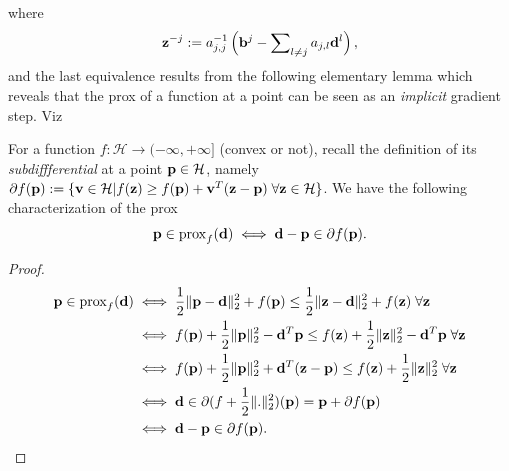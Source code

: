 where
\[
  \mathbf{z}^{-j} := a_{j,j}^{-1}\left(\mathbf{b}^j-\sum\nolimits_{l \ne j}a_{j,l}\mathbf{d}^l\right),
\]
and the last equivalence results from the following elementary lemma which reveals that the prox of a function at a point can be seen as an \textit{implicit} gradient step. Viz
\begin{lemma}
  For a function $f: \mathcal H \rightarrow (-\infty,+\infty]$ (convex or not), recall the definition of its \textit{subdiffferential} at a point $\mathbf{p} \in \mathcal H$, namely  $\partial f(\mathbf{p}) := \{\mathbf{v} \in \mathcal H | f(\mathbf{z}) \ge f(\mathbf{p}) + \mathbf{v}^T(\mathbf{z} - \mathbf{p})\; \forall \mathbf{z} \in \mathcal H\}$. We have the following characterization of the prox
  \begin{equation}
    \mathbf{p} \in \operatorname{prox}_{f}(\mathbf{d}) \iff \mathbf{d}-\mathbf{p} \in \partial f(\mathbf{p}).
\end{equation}

  \label{thm:implicit_grad}
\end{lemma}
\begin{proof}
  \[
    \begin{split}
      \mathbf{p} \in \operatorname{prox}_{f}(\mathbf{d}) &\iff \frac{1}{2}\|\mathbf{p}-\mathbf{d}\|_2^2 + f(\mathbf{p}) \le \frac{1}{2}\|\mathbf{z}-\mathbf{d}\|_2^2 + f(\mathbf{z})\; \forall \mathbf{z}\\
      &\iff f(\mathbf{p}) + \frac{1}{2}\|\mathbf{p}\|_2^2 -\mathbf{d}^T\mathbf{p} \le f(\mathbf{z}) + \frac{1}{2}\|\mathbf{z}\|_2^2 -\mathbf{d}^T\mathbf{p}\; \forall \mathbf{z}\\
      &\iff f(\mathbf{p}) + \frac{1}{2}\|\mathbf{p}\|_2^2 + \mathbf{d}^T(\mathbf{z}-\mathbf{p}) \le f(\mathbf{z}) + \frac{1}{2}\|\mathbf{z}\|_2^2\;\forall \mathbf{z}\\
      &\iff \mathbf{d} \in \partial (f + \frac{1}{2}\|.\|_2^2)(\mathbf{p}) = \mathbf{p} + \partial f(\mathbf{p})\\
      &\iff \mathbf{d} - \mathbf{p} \in \partial f(\mathbf{p}).
    \end{split}
  \]
\end{proof}

